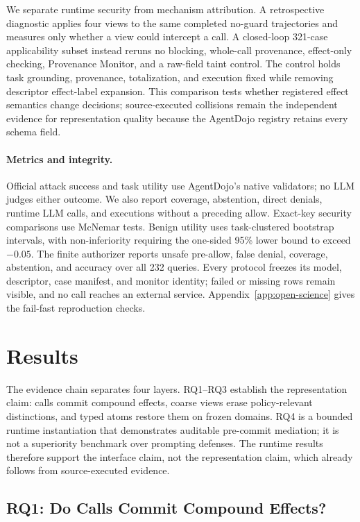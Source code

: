 \documentclass[letterpaper,twocolumn,10pt]{article}
\newcommand{\sys}{Provenance Monitor}
\theoremstyle{definition}
\begin{document}
We separate runtime security from mechanism attribution.  A retrospective
diagnostic applies four views to the same completed no-guard trajectories and
measures only whether a view could intercept a call.  A closed-loop 321-case
applicability subset instead reruns no blocking, whole-call provenance,
effect-only checking, \sys{}, and a raw-field taint control.  The control holds
task grounding, provenance, totalization, and execution fixed while removing
descriptor effect-label expansion.  This comparison tests whether registered
effect semantics change decisions; source-executed collisions remain the
independent evidence for representation quality because the AgentDojo registry
retains every schema field.

\paragraph{Metrics and integrity.}
Official attack success and task utility use AgentDojo's native validators; no
LLM judges either outcome.  We also report coverage, abstention, direct denials,
runtime LLM calls, and executions without a preceding allow.  Exact-key
security comparisons use McNemar tests.  Benign utility uses task-clustered
bootstrap intervals, with non-inferiority requiring the one-sided 95\% lower
bound to exceed $-0.05$.  The finite authorizer reports unsafe pre-allow, false
denial, coverage, abstention, and accuracy over all 232 queries.  Every protocol
freezes its model, descriptor, case manifest, and monitor identity; failed or
missing rows remain visible, and no call reaches an external service.
Appendix~\ref{app:open-science} gives the fail-fast reproduction checks.

\section{Results}
\label{sec:results}

The evidence chain separates four layers.  RQ1--RQ3 establish the
representation claim: calls commit compound effects, coarse views erase
policy-relevant distinctions, and typed atoms restore them on frozen domains.
RQ4 is a bounded runtime instantiation that demonstrates auditable
pre-commit mediation; it is not a superiority benchmark over prompting
defenses.  The runtime results therefore support the interface claim, not the
representation claim, which already follows from source-executed evidence.

\subsection{RQ1: Do Calls Commit Compound Effects?}
\end{document}
